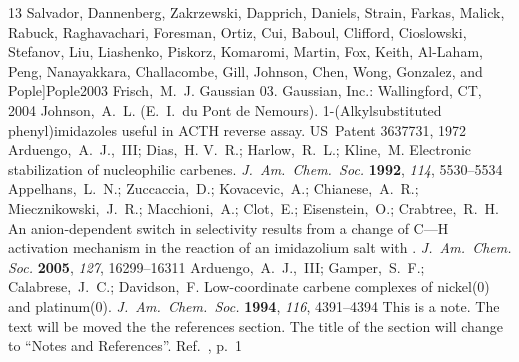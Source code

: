 \documentclass[journal=jacsat,manuscript=article]{achemso}
\begin{document}
\begin{mcitethebibliography}{13}
  Salvador, Dannenberg, Zakrzewski, Dapprich, Daniels, Strain, Farkas, Malick,
  Rabuck, Raghavachari, Foresman, Ortiz, Cui, Baboul, Clifford, Cioslowski,
  Stefanov, Liu, Liashenko, Piskorz, Komaromi, Martin, Fox, Keith, Al-Laham,
  Peng, Nanayakkara, Challacombe, Gill, Johnson, Chen, Wong, Gonzalez, and
  Pople]{Pople2003}
Frisch,~M.~J.   {Gaussian} 03. Gaussian, Inc.: Wallingford, CT,
  2004\relax
\mciteBstWouldAddEndPuncttrue
\mciteSetBstMidEndSepPunct{\mcitedefaultmidpunct}
{\mcitedefaultendpunct}{\mcitedefaultseppunct}\relax
\EndOfBibitem
{}
Johnson,~A.~L. (E.~I.~du Pont de Nemours). 1-(Alkylsubstituted
  phenyl)imidazoles useful in {ACTH} reverse assay. US~Patent 3637731,
  1972\relax
\mciteBstWouldAddEndPuncttrue
\mciteSetBstMidEndSepPunct{\mcitedefaultmidpunct}
{\mcitedefaultendpunct}{\mcitedefaultseppunct}\relax
\EndOfBibitem
{}
Arduengo,~A.~J.,~III; Dias,~H. V.~R.; Harlow,~R.~L.; Kline,~M. Electronic
  stabilization of nucleophilic carbenes. \emph{J.~Am.\ Chem.\ Soc.}
  \textbf{1992}, \emph{114}, 5530--5534\relax
\mciteBstWouldAddEndPuncttrue
\mciteSetBstMidEndSepPunct{\mcitedefaultmidpunct}
{\mcitedefaultendpunct}{\mcitedefaultseppunct}\relax
\EndOfBibitem
{}
Appelhans,~L.~N.; Zuccaccia,~D.; Kovacevic,~A.; Chianese,~A.~R.;
  Miecznikowski,~J.~R.; Macchioni,~A.; Clot,~E.; Eisenstein,~O.;
  Crabtree,~R.~H. An anion-dependent switch in selectivity results from a
  change of {C}---{H} activation mechanism in the reaction of an imidazolium
  salt with . \emph{J.~Am.\ Chem. Soc.} \textbf{2005},
  \emph{127}, 16299--16311\relax
\mciteBstWouldAddEndPuncttrue
\mciteSetBstMidEndSepPunct{\mcitedefaultmidpunct}
{\mcitedefaultendpunct}{\mcitedefaultseppunct}\relax
\EndOfBibitem
{}
Arduengo,~A.~J.,~III; Gamper,~S.~F.; Calabrese,~J.~C.; Davidson,~F.
  {Low}-coordinate carbene complexes of nickel(0) and platinum(0).
  \emph{J.~Am.\ Chem.\ Soc.} \textbf{1994}, \emph{116}, 4391--4394\relax
\mciteBstWouldAddEndPuncttrue
\mciteSetBstMidEndSepPunct{\mcitedefaultmidpunct}
{\mcitedefaultendpunct}{\mcitedefaultseppunct}\relax
\EndOfBibitem
{}
This is a note. The text will be moved the the references section. The title of
  the section will change to ``Notes and References''.\relax
\mciteBstWouldAddEndPunctfalse
\mciteSetBstMidEndSepPunct{\mcitedefaultmidpunct}
{}{\mcitedefaultseppunct}\relax
\EndOfBibitem
{}
Ref.~, p.~1\relax
\mciteBstWouldAddEndPuncttrue
\mciteSetBstMidEndSepPunct{\mcitedefaultmidpunct}
{\mcitedefaultendpunct}{\mcitedefaultseppunct}\relax
\EndOfBibitem
\end{mcitethebibliography}
\end{document}

